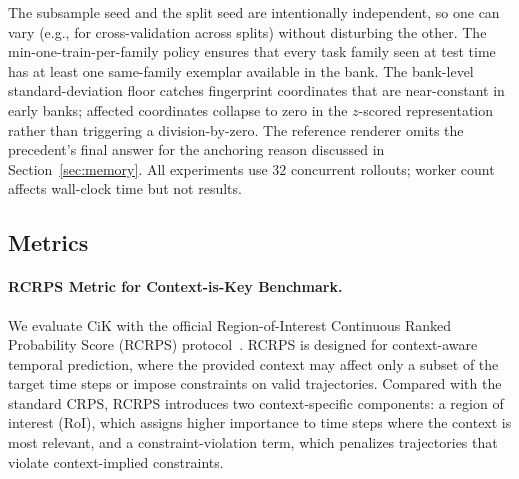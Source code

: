 The subsample seed and the split seed are intentionally independent, so one can vary (e.g., for cross-validation across splits) without disturbing the other. The min-one-train-per-family policy ensures that every task family seen at test time has at least one same-family exemplar available in the bank. The bank-level standard-deviation floor catches fingerprint coordinates that are near-constant in early banks; affected coordinates collapse to zero in the $z$-scored representation rather than triggering a division-by-zero. The reference renderer omits the precedent's final answer for the anchoring reason discussed in Section~\ref{sec:memory}. All experiments use 32 concurrent rollouts; worker count affects wall-clock time but not results.





\subsection{Metrics}
\label{ap:metrics}


\paragraph{RCRPS Metric for Context-is-Key Benchmark.}
We evaluate CiK with the official Region-of-Interest Continuous Ranked
Probability Score (RCRPS) protocol~\citep{DBLP:conf/icml/WilliamsAMZSRRL25}. RCRPS is designed for context-aware temporal prediction, where the provided context may affect only a subset of the target time steps or impose constraints on valid trajectories. Compared with the standard CRPS, RCRPS introduces two context-specific
components: a region of interest (RoI), which assigns higher importance to
time steps where the context is most relevant, and a constraint-violation term,
which penalizes trajectories that violate context-implied constraints.

